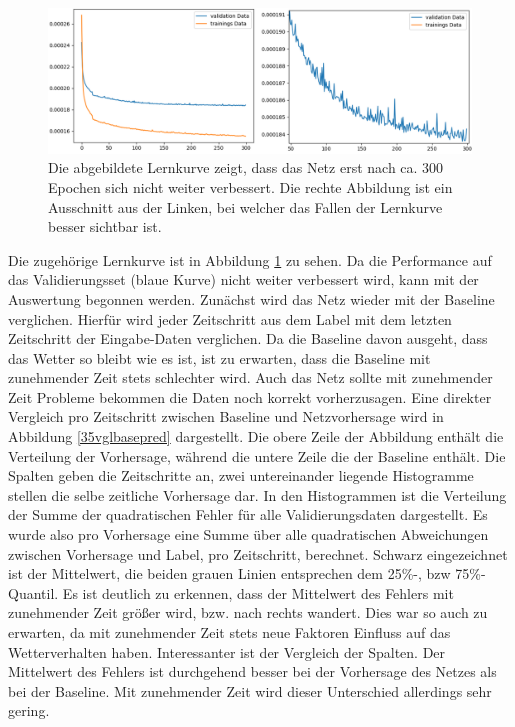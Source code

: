 \begin{figure}[h]
	\centering
	\includegraphics[width=\linewidth]{pics/lc_35minMSE.png}
	\caption[Lernkurve des UNet zur 35 Minuten Radar-Vorhersage]{Die abgebildete Lernkurve zeigt, dass das Netz erst nach ca. 300 Epochen sich nicht weiter verbessert. Die rechte Abbildung ist ein Ausschnitt aus der Linken, bei welcher das Fallen der Lernkurve besser sichtbar ist.}
	\label{lc_35minMSE}
\end{figure}

Die zugehörige Lernkurve ist in Abbildung \ref{lc_35minMSE} zu sehen. Da die Performance auf das Validierungsset (blaue Kurve) nicht weiter verbessert wird, kann mit der Auswertung begonnen werden.
Zunächst wird das Netz wieder mit der Baseline verglichen. Hierfür wird jeder Zeitschritt aus dem Label mit dem letzten Zeitschritt der Eingabe-Daten verglichen. Da die Baseline davon ausgeht, dass das Wetter so bleibt wie es ist, ist zu erwarten, dass die Baseline mit zunehmender Zeit stets schlechter wird. Auch das Netz sollte mit zunehmender Zeit Probleme bekommen die Daten noch korrekt vorherzusagen. Eine direkter Vergleich pro Zeitschritt zwischen Baseline und Netzvorhersage wird in Abbildung \ref{35vglbasepred} dargestellt.
Die obere Zeile der Abbildung enthält die Verteilung der Vorhersage, während die untere Zeile die der Baseline enthält. Die Spalten geben die Zeitschritte an, zwei untereinander liegende Histogramme stellen die selbe zeitliche Vorhersage dar. 
In den Histogrammen ist die Verteilung der Summe der quadratischen Fehler für alle Validierungsdaten dargestellt. Es wurde also pro Vorhersage eine Summe über alle quadratischen Abweichungen zwischen Vorhersage und Label, pro Zeitschritt, berechnet.
Schwarz eingezeichnet ist der Mittelwert, die beiden grauen Linien entsprechen dem 25\%-, bzw 75\%-Quantil. Es ist deutlich zu erkennen, dass der Mittelwert des Fehlers mit zunehmender Zeit größer wird, bzw. nach rechts wandert. Dies war so auch zu erwarten, da mit zunehmender Zeit stets neue Faktoren Einfluss auf das Wetterverhalten haben. Interessanter ist der Vergleich der Spalten. Der Mittelwert des Fehlers ist durchgehend besser bei der Vorhersage des Netzes als bei der Baseline. Mit zunehmender Zeit wird dieser Unterschied allerdings sehr gering.

